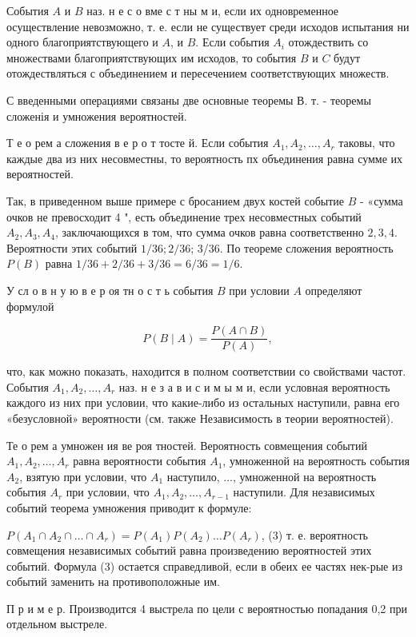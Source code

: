 \documentclass[10pt]{article}
\begin{document}
События $A$ и $B$ наз. н е с о вме с т ны м и, если их одновременное осуществление невозможно, т. е. если не существует среди исходов испытания ни одного благоприятствующего и $A$, и $B$. Если события $A_{i}$ отождествить со множествами благоприятствующих им исходов, то события $B$ и $C$ будут отождествляться с объединением и пересечением соответствующих множеств.



С введенными операциями связаны две основные теоремы В. т. - теоремы сложенія и умножения вероятностей.



Т е о рем а сложения в е р о т тосте й. Если события $A_{1}, A_{2}, \ldots, A_{r}$ таковы, что каждые два из них несовместны, то вероятность пх объединения равна сумме их вероятностей.



Так, в приведенном выше примере с бросанием двух костей событие $B$ - «сумма очков не превосходит 4 ", есть объединение трех несовместных событий $A_{2}, A_{3}, A_{4}$, заключающихся в том, что сумма очков равна соответственно $2,3,4$. Вероятности этих событий $1 / 36 ; 2 / 36$; 3/36. По теореме сложения вероятность $P(B)$ равна $1 / 36+2 / 36+3 / 36=6 / 36=1 / 6$.



У сл о в н у ю в е р оя тн о с т ь события $B$ при условии $A$ определяют формулой



\[

P(B \mid A)=\frac{P(A \cap B)}{P(A)},

\]



что, как можно показать, находится в полном соответствии со свойствами частот. События $A_{1}, A_{2}, \ldots, A_{r}$ наз. н е з а в и с и м ы м и, если условная вероятность каждого из них при условии, что какие-либо из остальных наступили, равна его «безусловной» вероятности (см. также Независимость в теории вероятностей).



Те о рем а умножен ия ве роя тностей. Вероятность совмещения событий $A_{1}, A_{2}, \ldots, A_{r}$ равна вероятности события $A_{1}$, умноженной на вероятность события $A_{2}$, взятую при условии, что $A_{1}$ наступило, $\ldots$, умноженной на вероятность события $A_{r}$ при условии, что $A_{1}, A_{2}, \ldots, A_{r-1}$ наступили. Для независимых событий теорема умножения приводит к формуле:



$P\left(A_{1} \cap A_{2} \cap \ldots \cap A_{r}\right)=P\left(A_{1}\right) P\left(A_{2}\right) \ldots P\left(A_{r}\right)$, (3) т. е. вероятность совмещения независимых событий равна произведению вероятностей этих событий. Формула (3) остается справедливой, если в обеих ее частях нек-рые из событий заменить на противоположные им.



П р и м е р. Производится 4 выстрела по цели с вероятностью попадания 0,2 при отдельном выстреле.
\end{document}
